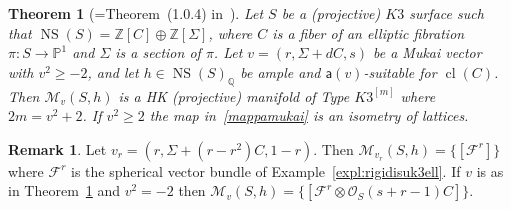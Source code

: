 \documentclass[11pt]{amsart}
\newcommand{\PP}{{\mathbb P}}
\newcommand{\QQ}{{\mathbb Q}}
\newcommand{\ZZ}{{\mathbb Z}}
\let\mathcal\mathscr
\def\cF{\mathcal{F}}
\def\cM{\mathcal{M}}
\def\cO{\mathcal{O}}
\DeclareMathOperator{\cl}{cl}
\DeclareMathOperator{\NS}{NS}
\newtheorem{thm}[lmm]{Theorem}
\theoremstyle{definition}
\newtheorem{rmk}[lmm]{Remark}
\theoremstyle{remark}
\begin{document}
\begin{thm}[=Theorem~(1.0.4) in~\cite{og:accaduespmod}]\label{thm:modfvellsez}
%
Let $S$ be a (projective) $K3$ surface such that $\NS(S)=\ZZ[C]\oplus\ZZ[\Sigma]$, where $C$ is a fiber of an elliptic fibration 
$\pi\colon S\to\PP^1$ and $\Sigma$ is a section of $\pi$. Let $v=(r,\Sigma+dC,s)$ be a Mukai vector with $v^2\ge -2$, and let 
 $h\in\NS(S)_{\QQ}$   be ample and ${\mathsf a}(v)$-suitable for $\cl(C)$. Then $\cM_v(S,h)$ is a HK (projective) manifold of Type $K3^{[m]}$ where $2m=v^2+2$.
If $v^2\ge 2$ the map in~\eqref{mappamukai} is an isometry of lattices.
%
\end{thm}
%
%
\begin{rmk}
%
Let $v_r=(r,\Sigma+(r-r^2)C,1-r)$. Then $\cM_{v_r}(S,h)=\{[\cF^r]\}$ where $\cF^r$ is the spherical vector bundle of Example~\ref{expl:rigidisuk3ell}. If $v$ is as in Theorem~\ref{thm:modfvellsez} and $v^2=-2$ then 
$\cM_{v}(S,h)=\{[\cF^r\otimes\cO_S(s+r-1)C]\}$. 
%
\end{rmk}
%


%
\end{document}
